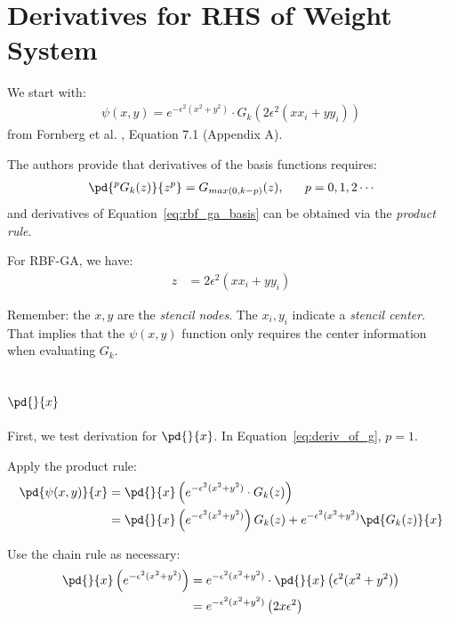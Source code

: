 \documentclass[11pt]{report}
\begin{document}
\tableofcontents
\fi

{ \graphicspath{{rbffd_methods_content/}}

\chapter{Derivatives for RHS of Weight System}
We start with:
\begin{align} 
\psi (x,y) = e^{-\epsilon^2(x^2+y^2)} \cdot G_k(2\epsilon^2(x x_i +y y_i)) \label{eq:rbf_ga_basis}
\end{align}
from Fornberg et al. \cite{FornbergLehtoPowell12}, Equation 7.1 (Appendix A).


The authors provide that derivatives of the basis functions requires:
\begin{align}
\pd{^p G_k(z)}{z^p} = G_{max(0,k-p)} (z), \ \ \ \ \ p = 0, 1, 2 \cdots 
\label{eq:deriv_of_g}
\end{align}
and derivatives of Equation~\ref{eq:rbf_ga_basis} can be obtained via the \emph{product rule}. 

For RBF-GA, we have: 
\begin{align}
z & = 2\epsilon^2(x x_i + y y_i) \label{eq:gamma_z}
\end{align}

Remember: the $x, y$ are the \emph{stencil nodes}. The $x_i, y_i$ indicate a \emph{stencil center}. That implies that the $\psi(x,y)$ function only requires the center information when evaluating $G_k$.

\section{$\pd{}{x}$}

First, we test derivation for $\pd{}{x}$. In Equation~\ref{eq:deriv_of_g}, $p=1$.

Apply the product rule: 
\begin{align}
\pd{\psi(x,y)}{x} & = \pd{}{x} \left( e^{-\epsilon^2(x^2+y^2)} \cdot G_k(z)  \right) \nonumber \\
& = \pd{}{x}\left( e^{-\epsilon^2 (x^2 + y^2)} \right) G_k(z) + e^{-\epsilon^2(x^2 + y^2)} \pd{G_k(z)}{x} \label{eq:x_product_rule}
\end{align}

Use the chain rule as necessary:
\begin{align}
\pd{}{x}\left( e^{-\epsilon^2 (x^2 + y^2)} \right) & = e^{-\epsilon^2 (x^2 + y^2)} \cdot \pd{}{x} \left( \epsilon^2(x^2+y^2) \right) \nonumber \\
        & = e^{-\epsilon^2 (x^2 + y^2)} \left(2x \epsilon^2 \right) \label{eq:x_part1}
\end{align}

}
\end{document}
